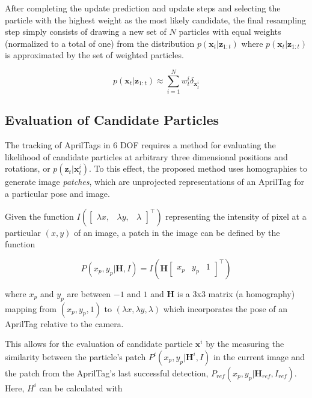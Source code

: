 \documentclass[letterpaper, 10 pt, conference]{ieeeconf}
\renewcommand{\vec}[1]{\boldsymbol{#1}}
\begin{document}
After completing the update prediction and update steps and selecting the particle with the highest weight as the most likely candidate, the final resampling step simply consists of drawing a new set of $N$ particles with equal weights (normalized to a total of one) from the distribution $p(\vec{x}_t|\vec{z}_{1:t})$ where $p(\vec{x}_t|\vec{z}_{1:t})$ is approximated by the set of weighted particles.

\begin{equation}
	p(\vec{x}_t|\vec{z}_{1:t}) \approx \sum_{i=1}^{N}{w^i_t\delta_{\vec{x}^i_t}}
\end{equation}

\subsection{Evaluation of Candidate Particles} \label{sec:candidate_particles}

The tracking of AprilTags in 6 DOF requires a method for evaluating the likelihood of candidate particles at arbitrary three dimensional positions and rotations, or $p(\vec{z}_t|\vec{x}^i_t)$. To this effect, the proposed method uses homographies to generate image \emph{patches}, which are unprojected representations of an AprilTag for a particular pose and image.


Given the function $I(\begin{bmatrix} \lambda x, & \lambda y, & \lambda \end{bmatrix}^\intercal )$ representing the intensity of pixel at a particular $(x,y)$ of an image, a patch in the image can be defined by the function 

\begin{equation}
P(x_p,y_p| \vec{H}, I ) = I(\vec{H}  \begin{bmatrix} x_p & y_p & 1\end{bmatrix}^\intercal)
\end{equation}

where $x_p$ and $y_p$ are between $-1$ and $1$ and $\vec{H}$ is a 3x3 matrix (a homography) mapping from $(x_p, y_p, 1)$ to $(\lambda x, \lambda y, \lambda)$ which incorporates the pose of an AprilTag relative to the camera. 


This allows for the evaluation of candidate particle $\vec{x}^i$ by the measuring the similarity between the particle's patch $P^i(x_p,y_p|\vec{H}^i,I)$ in the current image and the patch from the AprilTag's last successful detection, $P_{ref}(x_p,y_p|\vec{H}_{ref},I_{ref})$. Here, $H^i$ can be calculated with
\end{document}
